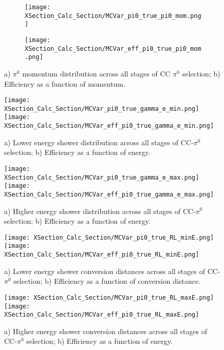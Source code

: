 \documentclass{article}
\begin{document}
\begin{figure}[t!]
\centering
  \begin{subfigure}[t]{0.39\textwidth}
    \centering
\texttt{[image: XSection\_Calc\_Section/MCVar\_pi0\_true\_pi0\_mom.png]}
  \caption{ }
  \end{subfigure} 
  \hspace{20mm}
  \begin{subfigure}[t]{0.39\textwidth}
    \centering
\texttt{[image: XSection\_Calc\_Section/MCVar\_eff\_pi0\_true\_pi0\_mom.png]}
  \caption{ }
  \end{subfigure} 
\caption{a) $\pi^0$ momentum distribution across all stages of CC $\pi^0$ selection; b) Efficiency as a function of momentum. }
\label{fig:pi0_effs_1}
\end{figure}

\begin{figure}[h!]
\centering
\texttt{[image: XSection\_Calc\_Section/MCVar\_pi0\_true\_gamma\_e\_min.png]}
\hspace{1 mm}
\texttt{[image: XSection\_Calc\_Section/MCVar\_eff\_pi0\_true\_gamma\_e\_min.png]}
\caption{a) Lower energy shower distribution across all stages of CC-$\pi^0$ selection; b) Efficiency as a function of energy. }
\label{fig:pi0_effs_2}
\end{figure}

\begin{figure}[h!]
\centering
\texttt{[image: XSection\_Calc\_Section/MCVar\_pi0\_true\_gamma\_e\_max.png]}
\hspace{1 mm}
\texttt{[image: XSection\_Calc\_Section/MCVar\_eff\_pi0\_true\_gamma\_e\_max.png]}
\caption{a) Higher energy shower distribution across all stages of CC-$\pi^0$ selection; b) Efficiency as a function of energy. }
\label{fig:pi0_effs_3}
\end{figure}

\begin{figure}[h!]
\centering
\texttt{[image: XSection\_Calc\_Section/MCVar\_pi0\_true\_RL\_minE.png]}
\hspace{1 mm}
\texttt{[image: XSection\_Calc\_Section/MCVar\_eff\_pi0\_true\_RL\_minE.png]}
\caption{a) Lower energy shower conversion distances across all stages of CC-$\pi^0$ selection; b) Efficiency as a function of conversion distance. }
\label{fig:pi0_effs_4}
\end{figure}

\begin{figure}[h!]
\centering
\texttt{[image: XSection\_Calc\_Section/MCVar\_pi0\_true\_RL\_maxE.png]}
\hspace{1 mm}
\texttt{[image: XSection\_Calc\_Section/MCVar\_eff\_pi0\_true\_RL\_maxE.png]}
\caption{a) Higher energy shower conversion distances across all stages of CC-$\pi^0$ selection; b) Efficiency as a function of energy. }
\label{fig:pi0_effs_5}
\end{figure}
\end{document}
